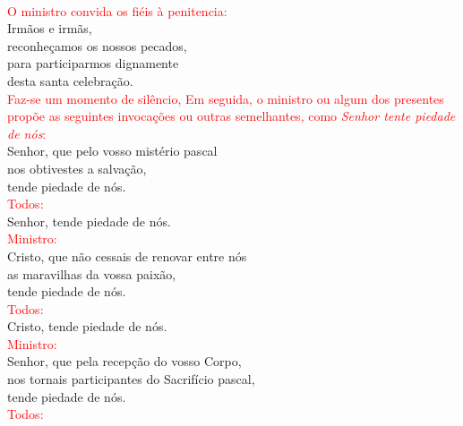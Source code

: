 \documentclass{book}
\begin{document}
\begin{flushleft}
    \vspace{.1cm} \\
    \textcolor{red}{O ministro convida os fiéis à penitencia:}
    \vspace{.1cm} \\
    Irmãos e irmãs, \\
    reconheçamos os nossos pecados, \\
    para participarmos dignamente \\
    desta santa celebração.
    \vspace{.1cm} \\
    \textcolor{red}{Faz-se um momento de silêncio, Em seguida, o ministro ou algum dos presentes propõe as seguintes invocações ou outras semelhantes, como \textit{Senhor tente piedade de nós}:}
    \vspace{.1cm} \\
    Senhor, que pelo vosso mistério pascal \\
    nos obtivestes a salvação, \\
    tende piedade de nós.
    \vspace{.1cm} \\
    \textcolor{red}{Todos:}
    \vspace{.1cm} \\
    Senhor, tende piedade de nós.
    \vspace{.1cm} \\
    \textcolor{red}{Ministro:}
    \vspace{.1cm} \\
    Cristo, que não cessais de renovar entre nós \\
    as maravilhas da vossa paixão, \\
    tende piedade de nós.
    \vspace{.1cm} \\
    \textcolor{red}{Todos:}
    \vspace{.1cm} \\
    Cristo, tende piedade de nós.
    \vspace{.1cm} \\
    \textcolor{red}{Ministro:}
    \vspace{.1cm} \\
    Senhor, que pela recepção do vosso Corpo, \\
    nos tornais participantes do Sacrifício pascal, \\
    tende piedade de nós.
    \vspace{.1cm} \\
    \textcolor{red}{Todos:}

\end{flushleft}
\end{document}
